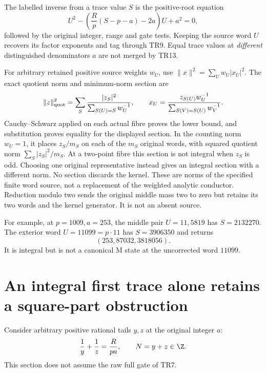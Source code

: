 The labelled inverse from a trace value $S$ is the positive-root equation
\[
 U^2-\left(\frac R p(S-p-a)-2a\right)U+a^2=0,            \tag{TR16}
\]
followed by the original integer, range and gate tests. Keeping the source word
$U$ recovers its factor exponents and tag through TR9. Equal trace values at
\emph{different} distinguished denominators $a$ are not merged by TR13.

For arbitrary retained positive source weights $w_U$, use
$\|x\|^2=\sum_Uw_U|x_U|^2$. The exact quotient norm and minimum-norm section are
\[
 \|z\|_{\rm quot}^2=\sum_S\frac{|z_S|^2}{\sum_{S(U)=S}w_U^{-1}},
 \qquad x_U=\frac{z_{S(U)}w_U^{-1}}{\sum_{S(V)=S(U)}w_V^{-1}}.
\]
Cauchy--Schwarz applied on each actual fibre proves the lower bound, and
substitution proves equality for the displayed section. In the counting norm
$w_U=1$, it places $z_S/m_S$ on each of the $m_S$ original words, with squared
quotient norm $\sum_S|z_S|^2/m_S$. At a two-point fibre this section is not
integral when $z_S$ is odd. Choosing one original representative instead gives
an integral section with a different norm. No section discards the kernel.
These are norms of the specified finite word source, not a replacement of the
weighted analytic conductor. Reduction
modulo two sends the original middle mass two to zero but retains its two words
and the kernel generator. It is not an absent source.

For example, at $p=1009,a=253$, the middle pair $U=11,5819$ has
$S=2132270$. The exterior word $U=11099=p\cdot11$ has $S=3906350$ and returns
\[
 (253,87032,3818056).
\]
It is integral but is not a canonical M state at the uncorrected word $11099$.

\section{An integral first trace alone retains a square-part obstruction}
Consider arbitrary positive rational tails $y,z$ at the original integer $a$:
\[
 \frac1y+\frac1z=\frac R{pa},\qquad N=y+z\in\Z.
\]
This section does not assume the raw full gate of TR7.

